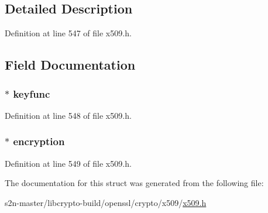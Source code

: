 \subsection{Detailed Description}


Definition at line 547 of file x509.\+h.



\subsection{Field Documentation}
\subsubsection[{\texorpdfstring{keyfunc}{keyfunc}}]{ $\ast$ keyfunc}\hypertarget{struct_p_b_e2_p_a_r_a_m__st_a43051d99944edfd254073c55c3655b97}{}\label{struct_p_b_e2_p_a_r_a_m__st_a43051d99944edfd254073c55c3655b97}


Definition at line 548 of file x509.\+h.

\subsubsection[{\texorpdfstring{encryption}{encryption}}]{ $\ast$ encryption}\hypertarget{struct_p_b_e2_p_a_r_a_m__st_abf4bb6eee5b572103b0eaad7166beb3f}{}\label{struct_p_b_e2_p_a_r_a_m__st_abf4bb6eee5b572103b0eaad7166beb3f}


Definition at line 549 of file x509.\+h.



The documentation for this struct was generated from the following file\+:\begin{DoxyCompactItemize}
\item 
s2n-\/master/libcrypto-\/build/openssl/crypto/x509/\hyperlink{crypto_2x509_2x509_8h}{x509.\+h}\end{DoxyCompactItemize}
